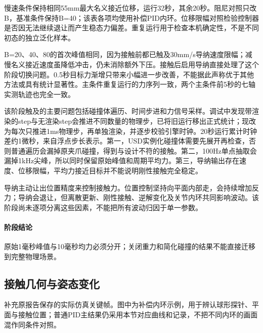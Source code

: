 慢速条件保持相同55mm最大名义接近位移，运行32秒，其余20秒。阻尼对照只改B，基准条件保持B=40；该表各项均使用补偿PID内环。位移限幅对照检验控制器是否因无法继续退让而产生稳态力偏差。重复运行用于检查本机确定性，不是不同初态的独立泛化样本。

B=20、40、80的首次峰值相同，因为接触前都已触及30mm/s导纳速度限幅；减慢名义接近速度虽降低冲击，仍未消除额外下压。接触后启用导纳直接处理了这个阶段切换问题。0.5秒目标力渐增只带来小幅进一步改善，不能据此声称优于其他方法或具有统计显著性。主条件重复运行的力序列一致，两个主条件前5秒的七轴实测轨迹也完全一致。


该阶段触及的主要问题包括碰撞体遍历、时间步进和力信号采样。调试中发现带渲染的step与无渲染step会推进不同数量的物理步，已将旧运行移出正式统计；现改为每次只推进1ms物理步，再单独渲染，并逐步校验引擎时钟。20秒运行累计时钟差约1微秒，来自浮点步长表示。第一，USD实例化碰撞体需要先展开再检查，否则普通遍历会漏掉原夹爪碰撞，得到与设计不符的接触。第二，100Hz单点抽取会漏掉1kHz尖峰，所以同时保留原始峰值和周期平均力。第三，导纳输出存在速度、位移限幅，平均力接近目标并不能说明刚性接触完全稳定。

导纳主动让出位置精度来控制接触力。位置控制坚持向平面内部走，会持续增加反力；导纳会退让，但离散更新、刚性接触、逆解变化及关节内环共同影响波动。该阶段尚未逐项分离这些因素，不能把所有波动归因于单一参数。


\paragraph{阶段结论}原始1毫秒峰值与10毫秒均力必须分开；关闭重力和简化碰撞的结果不能直接迁移到完整物理场景。



\subsection{接触几何与姿态变化}
补充原报告保存的实际仿真关键帧。图中为补偿内环示例，用于辨认球形探针、平面与接触位置；普通PID主结果仍采用本节对应曲线和记录，不把不同内环的画面混作同条件对照。


